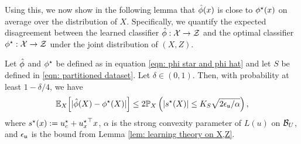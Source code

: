 Using this, we now show in the following lemma that $\hat{\phi}(x)$ is close to $\phi^\star(x)$ on average over the distribution of $X$. Specifically, we quantify the expected disagreement between the learned classifier $\hat{\phi}: \mathcal{X} \rightarrow \mathcal{Z}$ and the optimal classifier $\phi^\star: \mathcal{X} \rightarrow \mathcal{Z}$ under the joint distribution of $(X, Z)$.

\begin{lem}\label{lem: difference between classifier from cg{X} to cg{Z}}
     Let $\hat{\phi}$ and $\phi^\star$ be defined as in equation \eqref{eqn: phi star and phi hat} and let $S$ be defined in \eqref{eqn: partitioned dataset}. Let $\delta \in (0,1)$. Then, with probability at least $1-\delta/4$, we have
     \begin{equation*}
         \mathbb{E}_X \Big[| \hat{\phi}(X) - \phi^\star(X) |\Big] \le 2\mathbb{P}_X\left(|s^\star(X)| \le K_S \sqrt{2\epsilon_{\mathfrak{u}}/\alpha}\right),
     \end{equation*}
     where $s^\star(x) := u^\star_c + {u^\star_x}^\top x$, $\alpha$ is the strong convexity parameter of $L(u)$ on $\mathcal{B}_U$, and $\epsilon_{\mathfrak{u}}$ is the bound from Lemma \ref{lem: learning theory on X,Z}.
 \end{lem}
 
